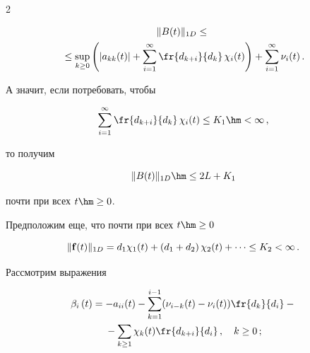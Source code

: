 \begin{multicols}{2}
\noindent

\begin{multline*}

\|B(t)\|_{1D} \le {}\\

{}\le \sup\limits_{k \ge 0} \left(

|a_{kk}(t)| + \sum\limits_{i=1}^{\infty}\fr{d_{k+i}}{d_k}\,\chi_i(t)\right)

+ \sum\limits_{i=1}^{\infty} \nu_{i}(t)\,.


\end{multline*}

А значит, если потребовать, чтобы

$$

\sum\limits_{i=1}^{\infty}\fr{d_{k+i}}{d_k}\,\chi_i(t) \le  K_1 \hm< \infty\,,

$$

то получим 

$$

\|B(t)\|_{1D}\hm \le 2L+ K_1

$$

 почти при всех $t \hm\ge 0$.



Предположим еще, что почти при всех $t \hm\ge 0$

\begin{equation*}

\|{\bf f}(t)\|_{1D} =  d_{1}\chi_1(t) + \left(d_{1}+d_{2}\right)\chi_2(t) + \dots \le K_2 < \infty \,.


\end{equation*}



\medskip



Рассмотрим выражения

\begin{multline*}

\beta_{i}\left( t\right) = -a_{ii}(t) - \sum\limits_{k=1}^{i-1}

(\nu_{i-k}(t)-\nu_i(t))\fr{d_k}{d_i}-{}\\

{}-\sum\limits_{k \ge 1} \chi_k(t)\fr{d_{k+i}}{d_i}\,, \quad k \ge 0\,;


\end{multline*}

\begin{equation*}


\end{equation*}
\end{multicols}

